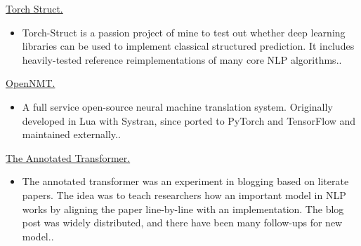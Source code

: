 \documentclass[10pt]{article}
\begin{document}
\ind \href{ paper.link } { Torch Struct. }
\begin{itemize}
	\item Torch-Struct is a passion project of mine to test out whether deep learning libraries can be used to implement classical structured prediction. It includes heavily-tested reference reimplementations of many core NLP algorithms..
\end{itemize}
\medskip


\ind \href{ paper.link } { OpenNMT. }
\begin{itemize}
	\item A full service open-source neural machine translation system. Originally developed in Lua with Systran, since ported to PyTorch and TensorFlow and maintained externally..
\end{itemize}
\medskip


\ind \href{ paper.link } { The Annotated Transformer. }
\begin{itemize}
	\item The annotated transformer was an experiment in blogging based on literate papers. The idea was to teach researchers how an important model in NLP works by aligning the paper line-by-line with an implementation. The blog post was widely distributed, and there have been many follow-ups for new model..
\end{itemize}
\medskip











\end{document}
